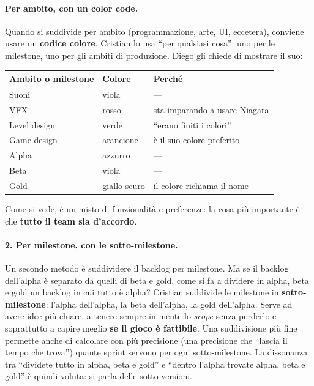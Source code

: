 \paragraph{Per ambito, con un color code.} Quando si suddivide per ambito
(programmazione, arte, UI, eccetera), conviene usare un \textbf{codice
colore}. Cristian lo usa ``per qualsiasi cosa'': uno per le milestone, uno
per gli ambiti di produzione. Diego gli chiede di mostrare il suo:
\begin{center}
  \begin{tabular}{@{}lll@{}}
    \toprule
    \textbf{Ambito o milestone} & \textbf{Colore} & \textbf{Perché} \\
    \midrule
    Suoni        & viola        & --- \\
    VFX          & rosso        & sta imparando a usare Niagara \\
    Level design & verde        & ``erano finiti i colori'' \\
    Game design  & arancione    & è il suo colore preferito \\
    \midrule
    Alpha        & azzurro      & --- \\
    Beta         & viola        & --- \\
    Gold         & giallo scuro & il colore richiama il nome \\
    \bottomrule
  \end{tabular}
\end{center}
Come si vede, è un misto di funzionalità e preferenze: la cosa più importante
è che \textbf{tutto il team sia d'accordo}.

\paragraph{2. Per milestone, con le sotto-milestone.} Un secondo metodo è
suddividere il backlog per milestone. Ma se il backlog dell'alpha è separato
da quelli di beta e gold, come si fa a dividere in alpha, beta e gold un
backlog in cui tutto è alpha? Cristian suddivide le milestone in
\textbf{sotto-milestone}: l'alpha dell'alpha, la beta dell'alpha, la gold
dell'alpha. Serve ad avere idee più chiare, a tenere sempre in mente lo
\emph{scope} senza perderlo e soprattutto a capire meglio \textbf{se il gioco
è fattibile}. Una suddivisione più fine permette anche di calcolare con più
precisione (una precisione che ``lascia il tempo che trova'') quante sprint
servono per ogni sotto-milestone. La dissonanza tra ``dividete tutto in alpha,
beta e gold'' e ``dentro l'alpha trovate alpha, beta e gold'' è quindi voluta:
si parla delle sotto-versioni.

